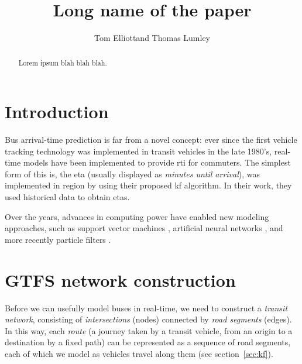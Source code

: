 \documentclass[times, doublespace]{anzsauth}
\begin{document}
\cleanlookdateon
{}
\title{Long name of the paper}
\author{Tom Elliott\corrauth and Thomas Lumley}
\address{
    Department of Statistics, University of Auckland, 
    Auckland 1142, New Zealand\\
    Email: \texttt{tom.elliott@auckland.ac.nz}
}

\begin{abstract}
Lorem ipsum blah blah blah.
\end{abstract}


\maketitle
\section{Introduction}
\label{sec:intro}

Bus arrival-time prediction is far from a novel concept: 
ever since the first vehicle tracking technology was implemented
in transit vehicles in the late 1980's, 
real-time models have been implemented to provide \gls{rti} for commuters.
The simplest form of this is, the \gls{eta}
(usually displayed as \emph{minutes until arrival}),
was implemented in {{region}} by \cite{Wall99analgorithm} 
using their proposed \gls{kf} algorithm.
In their work, they used historical data to obtain \glspl{eta}.

Over the years, advances in computing power have enabled new
modeling approaches,
such as support vector machines \citep{Yu_2006},
artificial neural networks \citep{Yu_2011},
and more recently particle filters \citep{Hans_2015}.



\section{GTFS network construction}
\label{sec:gtfs}



Before we can usefully model buses in real-tim{}e, 
we need to construct a \emph{transit network},
consisting of \emph{intersections} (nodes)
connected by \emph{road segments} (edges).
In this way, each \emph{route} 
(a journey taken by a transit vehicle, from an origin to a destination by a fixed path)
can be represented as a sequence of road segments,
each of which we model as vehicles travel along them (see section~\ref{sec:kf}).
\end{document}
